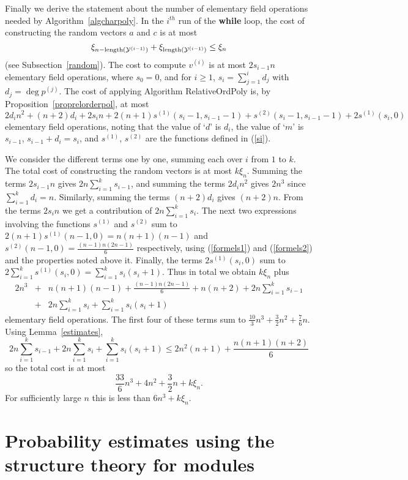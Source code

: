Finally we derive the statement about the number of elementary field operations
needed by Algorithm~\ref{algcharpoly}.
In the $i^{th}$ run of the {\bf while} loop, the cost of constructing the
random vectors $a$ and $c$ is at most 
\[ \xi_{n-\mathrm{length}(\mathcal{Y}^{(i-1)})}+\xi_{\mathrm{length}(\mathcal{Y}^{(i-1)})}
\leq \xi_{n} 
\]
(see Subsection~\ref{random}). The cost to compute $v^{(i)}$ is 
at most $2s_{i-1}n$ elementary field operations,
where $s_0=0$, and for $i\geq1$, $s_{i}=\sum_{j=1}^{i}d_j$ with 
$d_j=\deg p^{(j)}$. The cost 
of applying Algorithm {\sc RelativeOrdPoly}
is, by Proposition~\ref{proprelorderpol}, at most
\[ 
2d_in^2 + (n+2)d_i +2s_{i}n + 2(n+1)s^{(1)}(s_i-1,s_{i-1}-1) 
+ s^{(2)}(s_i-1,s_{i-1}-1) + 2s^{(1)}(s_i,0) 
\]
elementary field operations, noting that the value 
of `$d$' is $d_i$, the value of `$m$' is $s_{i-1}$, $s_{i-1}+d_i=s_i$,
and $s^{(1)}$, $s^{(2)}$ are the functions defined in (\ref{si}).

We consider the different terms
one by one, summing each over $i$ from $1$ to $k$. 
The total cost of constructing the random vectors is at most $k\xi_{n}$.
Summing the terms $2 s_{i-1} n$ gives $2n\sum_{i=1}^{k} s_{i-1}$, and
summing the terms $2d_in^2$ gives $2n^3$ since $\sum_{i=1}^k d_i=n$. 
Similarly, summing the terms
$(n+2)d_i$ gives $(n+2)n$. From the terms $2s_in$ we
get a contribution of 
$2n \sum_{i=1}^{k} s_i$.
The next two expressions involving the functions $s^{(1)}$ and $s^{(2)}$
sum to $2(n+1)s^{(1)}(n-1,0) = n(n+1)(n-1)$ and $s^{(2)}(n-1,0) = 
\frac{(n-1)n(2n-1)}{6}$ respectively, using (\ref{formels1}) and
(\ref{formels2}) and the properties noted
above it. 
Finally, the terms $2s^{(1)}(s_i,0)$ sum to 
$2\sum_{i=1}^k s^{(1)}(s_i,0) 
= \sum_{i=1}^k s_i(s_i+1)$.
Thus in total we obtain $k\xi_n$ plus
\begin{eqnarray*}
 2n^3
   &+&n(n+1)(n-1)
   +\frac{(n-1)n(2n-1)}{6}
   +n(n+2)
   +2n\sum_{i=1}^k s_{i-1} \\
   &+&2n\sum_{i=1}^k s_i
   +\sum_{i=1}^k s_i(s_i+1) 
\end{eqnarray*}
elementary field operations. The first four of these terms sum to $\frac{10}{3}n^3
   +\frac{3}{2}n^2
   +\frac{7}{6}n$. 
Using Lemma~\ref{estimates},
\[ 
   2n\sum_{i=1}^k s_{i-1}
   +2n\sum_{i=1}^k s_i
   +\sum_{i=1}^k s_i(s_i+1)\leq 2n^2(n+1)+\frac{n(n+1)(n+2)}{6} \]
so the total cost is at most 
\[
\frac{33}{6}n^3+4n^2+\frac{3}{2}n +k\xi_n.
\]
For sufficiently large $n$ this is less than $6n^3+k\xi_n$.
\proofend


\section{Probability estimates using the structure theory for modules}
\label{probest}

